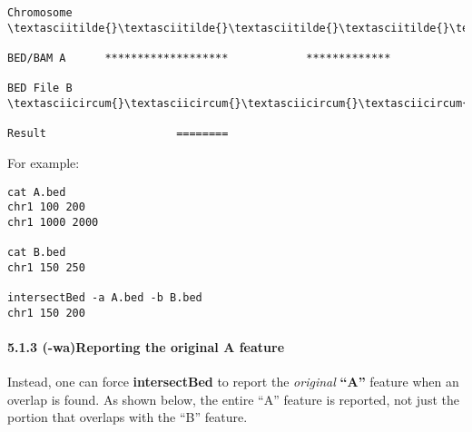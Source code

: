 \documentclass[letterpaper,10pt,english]{sphinxmanual}
\begin{document}
\begin{Verbatim}[commandchars=\\\{\}]
Chromosome  \textasciitilde{}\textasciitilde{}\textasciitilde{}\textasciitilde{}\textasciitilde{}\textasciitilde{}\textasciitilde{}\textasciitilde{}\textasciitilde{}\textasciitilde{}\textasciitilde{}\textasciitilde{}\textasciitilde{}\textasciitilde{}\textasciitilde{}\textasciitilde{}\textasciitilde{}\textasciitilde{}\textasciitilde{}\textasciitilde{}\textasciitilde{}\textasciitilde{}\textasciitilde{}\textasciitilde{}\textasciitilde{}\textasciitilde{}\textasciitilde{}\textasciitilde{}\textasciitilde{}\textasciitilde{}\textasciitilde{}\textasciitilde{}\textasciitilde{}\textasciitilde{}\textasciitilde{}\textasciitilde{}\textasciitilde{}\textasciitilde{}\textasciitilde{}\textasciitilde{}\textasciitilde{}\textasciitilde{}\textasciitilde{}\textasciitilde{}\textasciitilde{}\textasciitilde{}\textasciitilde{}\textasciitilde{}\textasciitilde{}\textasciitilde{}\textasciitilde{}\textasciitilde{}\textasciitilde{}\textasciitilde{}\textasciitilde{}\textasciitilde{}\textasciitilde{}\textasciitilde{}\textasciitilde{}\textasciitilde{}\textasciitilde{}\textasciitilde{}\textasciitilde{}\textasciitilde{}

BED/BAM A      *******************            *************

BED File B                \textasciicircum{}\textasciicircum{}\textasciicircum{}\textasciicircum{}\textasciicircum{}\textasciicircum{}\textasciicircum{}\textasciicircum{}

Result                    ========
\end{Verbatim}

For example:

\begin{Verbatim}[commandchars=\\\{\}]
cat A.bed
chr1 100 200
chr1 1000 2000

cat B.bed
chr1 150 250

intersectBed -a A.bed -b B.bed
chr1 150 200
\end{Verbatim}


\paragraph{5.1.3 (-wa)Reporting the original A feature}
\label{content/intersectBed:wa-reporting-the-original-a-feature}
Instead, one can force \textbf{intersectBed} to report the \emph{original} \textbf{``A''} feature when an overlap is found. As
shown below, the entire ``A'' feature is reported, not just the portion that overlaps with the ``B'' feature.
\end{document}
